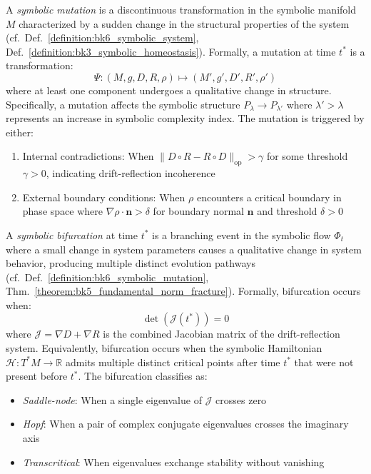 \begin{definition}
\label{definition:bk6_symbolic_mutation}
A \emph{symbolic mutation} is a discontinuous transformation in the symbolic manifold $M$ characterized by a sudden change in the structural properties of the system (cf.~Def.~\ref{definition:bk6_symbolic_system}, Def.~\ref{definition:bk3_symbolic_homeostasis}). Formally, a mutation at time $t^*$ is a transformation:
\begin{equation}
\Psi: (M, g, D, R, \rho) \mapsto (M', g', D', R', \rho')
\end{equation}
where at least one component undergoes a qualitative change in structure. Specifically, a mutation affects the symbolic structure $P_\lambda \to P_{\lambda'}$ where $\lambda' > \lambda$ represents an increase in symbolic complexity index.
The mutation is triggered by either:
\begin{enumerate}
\item Internal contradictions: When $\|D \circ R - R \circ D\|_{\text{op}} > \gamma$ for some threshold $\gamma > 0$, indicating drift-reflection incoherence
\item External boundary conditions: When $\rho$ encounters a critical boundary in phase space where $\nabla \rho \cdot \mathbf{n} > \delta$ for boundary normal $\mathbf{n}$ and threshold $\delta > 0$
\end{enumerate}
\end{definition}
\begin{definition}
\label{definition:bk6_symbolic_bifurcation}
A \emph{symbolic bifurcation} at time $t^*$ is a branching event in the symbolic flow $\Phi_t$ where a small change in system parameters causes a qualitative change in system behavior, producing multiple distinct evolution pathways (cf.~Def.~\ref{definition:bk6_symbolic_mutation}, Thm.~\ref{theorem:bk5_fundamental_norm_fracture}). Formally, bifurcation occurs when:
\begin{equation}
\det(\mathcal{J}(t^*)) = 0
\end{equation}
where $\mathcal{J} = \nabla D + \nabla R$ is the combined Jacobian matrix of the drift-reflection system. Equivalently, bifurcation occurs when the symbolic Hamiltonian $\mathcal{H}: T^*M \rightarrow \mathbb{R}$ admits multiple distinct critical points after time $t^*$ that were not present before $t^*$.
The bifurcation classifies as:
\begin{itemize}
\item \emph{Saddle-node}: When a single eigenvalue of $\mathcal{J}$ crosses zero
\item \emph{Hopf}: When a pair of complex conjugate eigenvalues crosses the imaginary axis
\item \emph{Transcritical}: When eigenvalues exchange stability without vanishing
\end{itemize}
\end{definition}
